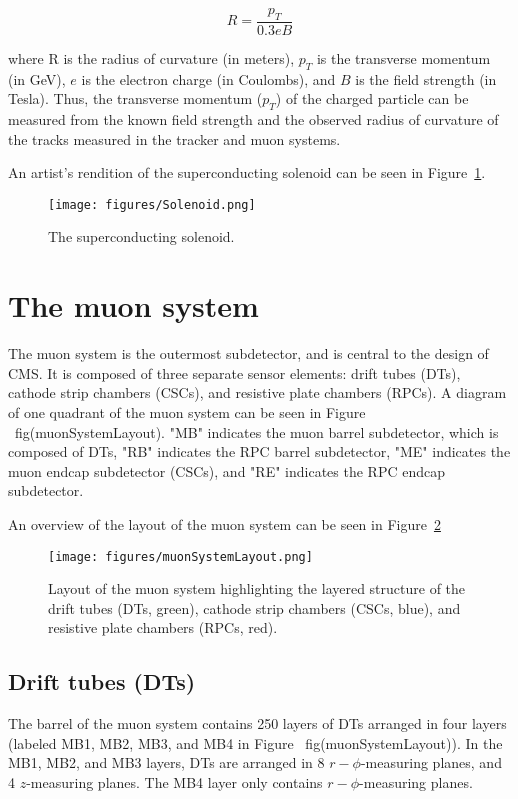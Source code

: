 $$R = \frac{p_{T}}{0.3eB}$$



where R is the radius of curvature (in meters), $p_{T}$ is the transverse momentum (in GeV), $e$ is the electron charge (in Coulombs), and $B$ is the field strength (in Tesla). Thus, the transverse momentum ($p_{T}$) of the charged particle can be measured from the known field strength and the observed radius of curvature of the tracks measured in the tracker and muon systems.

An artist's rendition of the superconducting solenoid can be seen in Figure~\ref{fig:Solenoid}.

\begin{figure}\centering
  \texttt{[image: figures/Solenoid.png]}
  \caption{\label{fig:Solenoid} The superconducting solenoid.}
\end{figure}

\section{The muon system}

The muon system is the outermost subdetector, and is central to the design of CMS. It is composed of three separate sensor elements: drift tubes (DTs), cathode strip chambers (CSCs), and resistive plate chambers (RPCs). A diagram of one quadrant of the muon system can be seen in Figure ~fig(muonSystemLayout). "MB" indicates the muon barrel subdetector, which is composed of DTs, "RB" indicates the RPC barrel subdetector, "ME" indicates the muon endcap subdetector (CSCs), and "RE" indicates the RPC endcap subdetector. 

An overview of the layout of the muon system can be seen in Figure~\ref{fig:muonSystemLayout}

\begin{figure}\centering
  \texttt{[image: figures/muonSystemLayout.png]}
  \caption{\label{fig:muonSystemLayout} Layout of the muon system highlighting the layered structure of the drift tubes (DTs, green), cathode strip chambers (CSCs, blue), and resistive plate chambers (RPCs, red).}
\end{figure}

\subsection{Drift tubes (DTs)}

The barrel of the muon system contains 250 layers of DTs arranged in four layers (labeled MB1, MB2, MB3, and MB4 in Figure ~fig(muonSystemLayout)). In the MB1, MB2, and MB3 layers, DTs are arranged in 8 $r-\phi$-measuring planes, and 4 $z$-measuring planes. The MB4 layer only contains $r-\phi$-measuring planes.

